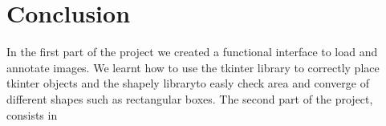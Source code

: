 \documentclass[a4paper, 11pt]{article}
\begin{document}
\section{Conclusion}
In the first part of the project we created a functional interface to load and annotate images. We learnt how to use the tkinter library to correctly place tkinter objects and the shapely libraryto easly check area and converge of different shapes such as rectangular boxes.
The second part of the project, consists in
\end{document}
